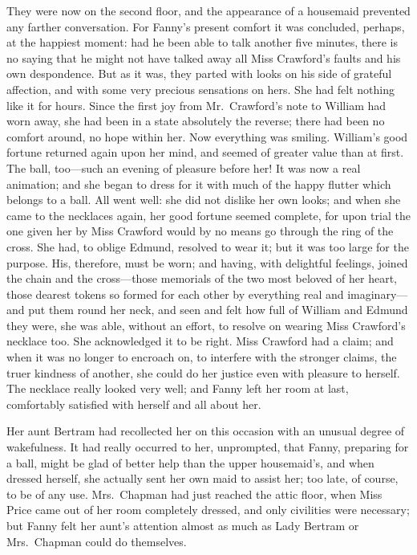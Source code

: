 \documentclass{article}
\begin{document}
They were now on the second floor, and the appearance
of a housemaid prevented any farther conversation.
For Fanny's present comfort it was concluded, perhaps,
at the happiest moment:  had he been able to talk another
five minutes, there is no saying that he might not have talked
away all Miss Crawford's faults and his own despondence.
But as it was, they parted with looks on his side of
grateful affection, and with some very precious sensations
on hers.  She had felt nothing like it for hours.
Since the first joy from Mr.\ Crawford's note to William had
worn away, she had been in a state absolutely the reverse;
there had been no comfort around, no hope within her.
Now everything was smiling.  William's good fortune
returned again upon her mind, and seemed of greater
value than at first.  The ball, too---such an evening
of pleasure before her!  It was now a real animation;
and she began to dress for it with much of the happy
flutter which belongs to a ball.  All went well:
she did not dislike her own looks; and when she came
to the necklaces again, her good fortune seemed complete,
for upon trial the one given her by Miss Crawford would
by no means go through the ring of the cross.  She had,
to oblige Edmund, resolved to wear it; but it was too
large for the purpose.  His, therefore, must be worn;
and having, with delightful feelings, joined the chain
and the cross---those memorials of the two most beloved
of her heart, those dearest tokens so formed for each
other by everything real and imaginary---and put them
round her neck, and seen and felt how full of William
and Edmund they were, she was able, without an effort,
to resolve on wearing Miss Crawford's necklace too.
She acknowledged it to be right.  Miss Crawford had a claim;
and when it was no longer to encroach on, to interfere
with the stronger claims, the truer kindness of another,
she could do her justice even with pleasure to herself.
The necklace really looked very well; and Fanny left her
room at last, comfortably satisfied with herself and all
about her.

Her aunt Bertram had recollected her on this occasion with
an unusual degree of wakefulness.  It had really occurred
to her, unprompted, that Fanny, preparing for a ball,
might be glad of better help than the upper housemaid's,
and when dressed herself, she actually sent her own maid
to assist her; too late, of course, to be of any use.
Mrs.\ Chapman had just reached the attic floor, when Miss
Price came out of her room completely dressed, and only
civilities were necessary; but Fanny felt her aunt's
attention almost as much as Lady Bertram or Mrs.\ Chapman
could do themselves.
\end{document}
